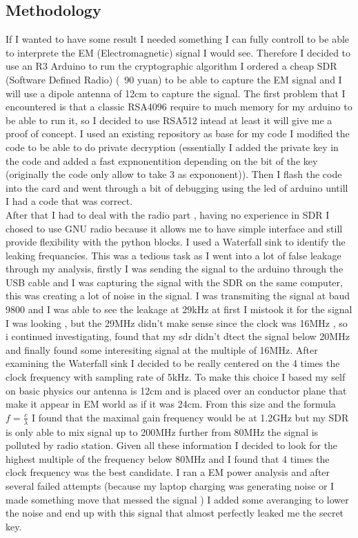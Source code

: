 \documentclass{article}
\begin{document}
\subsection{Methodology}
If I wanted to have some result I needed something I can fully controll to be able to interprete the EM (Electromagnetic) signal I would see. Therefore I decided to use an R3 Arduino to run the cryptographic algorithm I ordered a cheap SDR (Software Defined Radio) (~90 yuan) to be able to capture the EM signal and I will use a dipole antenna of 12cm to capture the signal.
The first problem that I encountered is that a classic RSA4096 require to much memory for my arduino to be able to run it, so I decided to use RSA512 intead at least it will give me a proof of concept. I used an existing repository as base for my code \cite{github} I modified the code to be able to do private decryption (essentially I added the private key in the code and added a fast expnonentition depending on the bit of the key (originally the code only allow to take 3 as expononent)). Then I flash the code into the card and went through a bit of debugging using the led of arduino untill I had a code that was correct.
\\
After that I had to deal with the radio part , having no experience in SDR I chosed to use GNU radio because it allows me to have simple interface and still provide flexibility with the python blocks. I used a Waterfall sink to identify the leaking frequancies. This was a tedious task as I went into a lot of false leakage through my analysis, firstly I was sending the signal to the arduino through the USB cable and I was capturing the signal with the SDR on the same computer, this was creating a lot of noise in the signal. I was transmiting the signal at baud 9800 and I was able to see the leakage at 29kHz at first I mistook it for the signal I was looking , but the 29MHz didn't make sense since the clock was 16MHz , so i continued investigating, found that my sdr didn't dtect the signal below 20MHz and finally found some interesiting signal at the multiple of 16MHz. 
After examining the Waterfall sink I decided to be really centered on the 4 times the clock frequency with sampling rate of 5kHz. To make this choice I based my self on basic physics our antenna is 12cm and is placed over an conductor plane that make it appear in EM world as if it was 24cm. From this size and the formula $f = \frac{c}{\lambda}$ I found that the maximal gain frequency would be at 1.2GHz but my SDR is only able to mix signal up to 200MHz further from 80MHz the signal is polluted by radio station. Given all these information I decided to look for the highest multiple of the frequency below 80MHz and I found that 4 times the clock frequency was the best candidate. I ran a EM power analysis and after several failed attempts (because my laptop charging was generating noise or I made something move that messed the signal ) I added some averanging to lower the noise and end up with this signal that almost perfectly leaked me the secret key.
\end{document}
